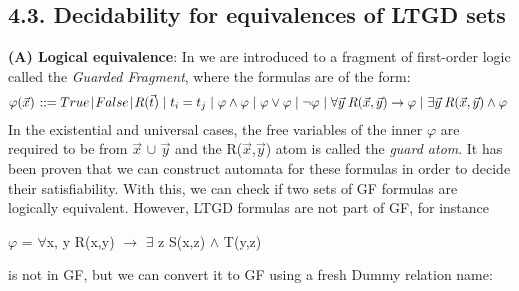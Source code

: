 \documentclass[11pt, a4paper, dvipsnames]{article}
\begin{document}
\subsection{4.3. Decidability for equivalences of LTGD sets}
\textbf{(A) Logical equivalence}:\newline
In \cite{decidable} we are introduced to a fragment of first-order logic called the \textit{Guarded Fragment}, where the formulas are of the form:
\begin{gather*}
\varphi(\vec{x}) \hspace{0.1em} ::= True \hspace{0.1em} | \hspace{0.1em} False \hspace{0.1em} | \hspace{0.1em} R(\vec{t}) \hspace{0.3em} |\hspace{0.3em} t_{i} = t_{j} \hspace{0.3em}| \hspace{0.3em}\varphi \wedge \varphi \hspace{0.3em}| \hspace{0.3em}\varphi \vee \varphi \hspace{0.3em}| \hspace{0.3em}\neg \varphi \hspace{0.3em}| \hspace{0.3em}\forall \vec{y} \hspace{0.25em} R(\vec{x}, \vec{y}) \rightarrow \varphi \hspace{0.3em}|\hspace{0.3em} \exists \vec{y} \hspace{0.25em} R(\vec{x}, \vec{y}) \wedge \varphi\hspace{0.3em}
\end{gather*}
In the existential and universal cases, the free variables of the inner $\varphi$ are required to be from $\vec{x}$ $\cup$ $\vec{y}$ and the R($\vec{x}$,$\vec{y}$) atom is called the \textit{guard atom}.\newline
It has been proven that we can construct automata for these formulas in order to decide their satisfiability. With this, we can check if two sets of GF formulas are logically equivalent. However, LTGD formulas are not part of GF, for instance 
\begin{center}
$\varphi$ = $\forall$x, y R(x,y) $\rightarrow$ $\exists$ z S(x,z) $\wedge$ T(y,z)
\end{center}
is not in GF, but we can convert it to GF using a fresh Dummy relation name:
\end{document}
